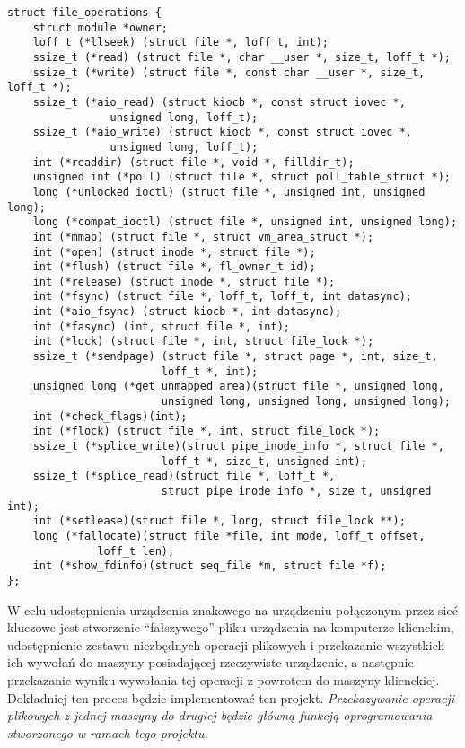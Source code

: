 \begin{verbatim}
struct file_operations {
    struct module *owner;
    loff_t (*llseek) (struct file *, loff_t, int);
    ssize_t (*read) (struct file *, char __user *, size_t, loff_t *);
    ssize_t (*write) (struct file *, const char __user *, size_t, loff_t *);
    ssize_t (*aio_read) (struct kiocb *, const struct iovec *,
                unsigned long, loff_t);
    ssize_t (*aio_write) (struct kiocb *, const struct iovec *,
                unsigned long, loff_t);
    int (*readdir) (struct file *, void *, filldir_t);
    unsigned int (*poll) (struct file *, struct poll_table_struct *);
    long (*unlocked_ioctl) (struct file *, unsigned int, unsigned long);
    long (*compat_ioctl) (struct file *, unsigned int, unsigned long);
    int (*mmap) (struct file *, struct vm_area_struct *);
    int (*open) (struct inode *, struct file *);
    int (*flush) (struct file *, fl_owner_t id);
    int (*release) (struct inode *, struct file *);
    int (*fsync) (struct file *, loff_t, loff_t, int datasync);
    int (*aio_fsync) (struct kiocb *, int datasync);
    int (*fasync) (int, struct file *, int);
    int (*lock) (struct file *, int, struct file_lock *);
    ssize_t (*sendpage) (struct file *, struct page *, int, size_t,
                        loff_t *, int);
    unsigned long (*get_unmapped_area)(struct file *, unsigned long,
                        unsigned long, unsigned long, unsigned long);
    int (*check_flags)(int);
    int (*flock) (struct file *, int, struct file_lock *);
    ssize_t (*splice_write)(struct pipe_inode_info *, struct file *,
                        loff_t *, size_t, unsigned int);
    ssize_t (*splice_read)(struct file *, loff_t *,
                        struct pipe_inode_info *, size_t, unsigned int);
    int (*setlease)(struct file *, long, struct file_lock **);
    long (*fallocate)(struct file *file, int mode, loff_t offset,
              loff_t len);
    int (*show_fdinfo)(struct seq_file *m, struct file *f);
};
\end{verbatim}

W celu udostępnienia urządzenia znakowego na urządzeniu połączonym przez
sieć kluczowe jest stworzenie ``fałszywego'' pliku urządzenia na
komputerze klienckim, udostępnienie zestawu niezbędnych operacji
plikowych i przekazanie wszystkich ich wywołań do maszyny posiadającej
rzeczywiste urządzenie, a następnie przekazanie wyniku wywołania tej
operacji z powrotem do maszyny klienckiej. Dokładniej ten proces będzie
implementować ten projekt. \emph{Przekazywanie operacji plikowych z
jednej maszyny do drugiej będzie główną funkcją oprogramowania
stworzonego w ramach tego projektu.}

